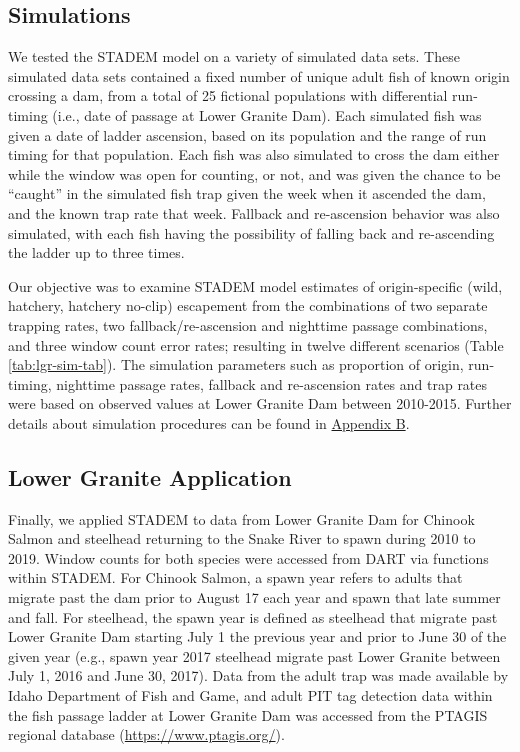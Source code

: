 \documentclass[
  12pt,
]{article}
\begin{document}
\hypertarget{simulations}{%
\subsection{Simulations}\label{simulations}}

We tested the STADEM model on a variety of simulated data sets. These simulated data sets contained a fixed number of unique adult fish of known origin crossing a dam, from a total of 25 fictional populations with differential run-timing (i.e., date of passage at Lower Granite Dam). Each simulated fish was given a date of ladder ascension, based on its population and the range of run timing for that population. Each fish was also simulated to cross the dam either while the window was open for counting, or not, and was given the chance to be ``caught'' in the simulated fish trap given the week when it ascended the dam, and the known trap rate that week. Fallback and re-ascension behavior was also simulated, with each fish having the possibility of falling back and re-ascending the ladder up to three times.

Our objective was to examine STADEM model estimates of origin-specific (wild, hatchery, hatchery no-clip) escapement from the combinations of two separate trapping rates, two fallback/re-ascension and nighttime passage combinations, and three window count error rates; resulting in twelve different scenarios (Table \ref{tab:lgr-sim-tab}). The simulation parameters such as proportion of origin, run-timing, nighttime passage rates, fallback and re-ascension rates and trap rates were based on observed values at Lower Granite Dam between 2010-2015. Further details about simulation procedures can be found in \protect\hyperlink{append2}{Appendix B}.

\hypertarget{lower-granite-application}{%
\subsection{Lower Granite Application}\label{lower-granite-application}}

Finally, we applied STADEM to data from Lower Granite Dam for Chinook Salmon and steelhead returning to the Snake River to spawn during 2010 to 2019. Window counts for both species were accessed from DART via functions within STADEM. For Chinook Salmon, a spawn year refers to adults that migrate past the dam prior to August 17 each year and spawn that late summer and fall. For steelhead, the spawn year is defined as steelhead that migrate past Lower Granite Dam starting July 1 the previous year and prior to June 30 of the given year (e.g., spawn year 2017 steelhead migrate past Lower Granite between July 1, 2016 and June 30, 2017). Data from the adult trap was made available by Idaho Department of Fish and Game, and adult PIT tag detection data within the fish passage ladder at Lower Granite Dam was accessed from the PTAGIS regional database (\url{https://www.ptagis.org/}).
\end{document}
